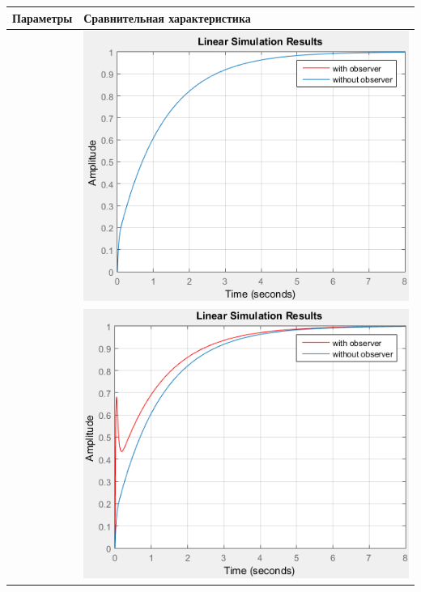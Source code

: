 \documentclass[14pt,a4paper,report]{report}
\begin{document}
\begin{table}[h!]
	\centering
	\bgroup
	\def\arraystretch{3}
	\begin{tabular}{ | m{4cm} | m{8cm} | }
		\hline
		Параметры & Сравнительная характеристика \\ \hline
		
		\text{$k_0=31.623$, $k_1=16.088$}\linebreak \text{$\alpha=-16$, $\beta=-32$, $\gamma=0$} & 
		\begin{minipage}{.3\textwidth}
			\includegraphics[scale = 0.48]{images/e1.png}
		\end{minipage}
		\\\hline
		
		\text{$k_0=31.623$, $k_1=16.088$}\linebreak \text{$\alpha=-16$, $\beta=-32$, $\gamma=0.2$} & 
		\begin{minipage}{.3\textwidth}
			\includegraphics[scale = 0.48]{images/e2.png}
		\end{minipage}
		\\\hline
		

\end{tabular}
\end{table}
\end{document}
